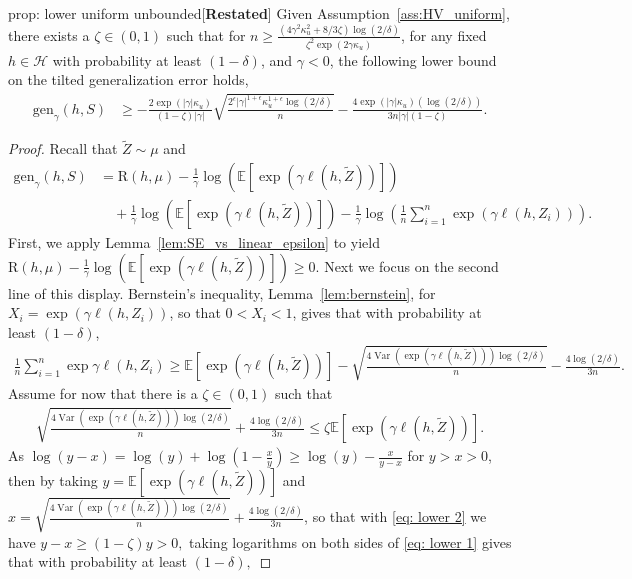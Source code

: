 \documentclass{article}
\theoremstyle{plain}
\theoremstyle{plain}
\theoremstyle{definition}
\theoremstyle{remark}
\newcommand{\blue}{\color{black}}
\begin{document}
{\blue
\begin{tcolorbox}
    \begin{repproposition}{prop: lower uniform unbounded}[\textbf{Restated}]
    Given Assumption~\ref{ass:HV_uniform}, there exists a $\zeta\in(0,1)$ such that for $n\geq \frac{(4\gamma^2\kappa_u^2+8/3 \zeta )\log(2/\delta)}{\zeta^2\exp(2\gamma \kappa_u)}$, for any fixed $h\in\mathcal{H}$ with probability at least $(1-\delta)$, and $\gamma<0$, the following lower bound on the tilted generalization error holds,
    \begin{equation} 
    \begin{split}
    \mathrm{gen}_{\gamma}(h,S)&\geq -\frac{2\exp(|\gamma| \kappa_u)}{(1-\zeta)|\gamma|}\sqrt{\frac{2^{\epsilon}|\gamma|^{1+\epsilon}\kappa_u^{1+\epsilon}\log(2/\delta)}{n}}-\frac{4\exp(|\gamma| \kappa_u)(\log(2/\delta))}{3n|\gamma|(1-\zeta)}. 
        \end{split}
        \end{equation}
\end{repproposition}
\end{tcolorbox}

\begin{proof}
    Recall that $\tilde{Z} \sim \mu$ and $$\begin{aligned} \mathrm{gen}_{\gamma}(h,S) &= \mathrm{R}(h,\mu)-\frac{1}{\gamma}\log(\mathbb{E}[\exp(\gamma \ell(h,\tilde{Z}))])\\&\quad+\frac{1}{\gamma}\log(\mathbb{E} [\exp(\gamma \ell(h,\tilde{Z}))])-\frac{1}{\gamma}\log\left(\frac{1}{n}\sum_{i=1}^n \exp(\gamma \ell(h,Z_i))\right). \end{aligned}$$ First, we apply Lemma~\ref{lem:SE_vs_linear_epsilon} to yield $\mathrm{R}(h,\mu)-\frac{1}{\gamma}\log(\mathbb{E} [\exp(\gamma \ell(h,\tilde{Z}))]) \ge 0$. Next we focus on the second line of this display. Bernstein's inequality, Lemma~\ref{lem:bernstein}, for $X_i=\exp(\gamma\ell(h,Z_i))$, so that $0<X_i<1$, gives that with probability at least $(1-\delta)$,
\begin{align}\label{eq: lower 1} \frac{1}{n}\sum_{i=1}^n \exp{\gamma \ell(h,Z_i)}\geq \mathbb{E}[\exp(\gamma \ell(h,\tilde Z))]- \sqrt{\frac{4\operatorname{Var}(\exp(\gamma \ell(h,\tilde Z)))\log(2/\delta)}{n}}-\frac{4\log(2/\delta)}{3n}. \end{align}
Assume for now that there is a $\zeta\in(0,1)$ such that \begin{align}\label{eq: lower 2} \sqrt{\frac{4\operatorname{Var}(\exp(\gamma \ell(h,\tilde Z)))\log(2/\delta)}{n}}+\frac{4\log(2/\delta)}{3n}\leq \zeta \mathbb{E}[\exp(\gamma \ell(h,\tilde Z))]. \end{align} 
As $\log(y-x)=\log(y)+\log(1-\frac{x}{y})\geq \log(y)-\frac{x}{y-x}$ for $y>x>0$, then by taking $y= \mathbb{E} [\exp(\gamma \ell(h,\tilde Z))]$ and $x=\sqrt{\frac{4\operatorname{Var}(\exp(\gamma \ell(h,\tilde Z)))\log(2/\delta)}{n}}+\frac{4\log(2/\delta)}{3n}$, so that with \eqref{eq: lower 2} we have $ y - x \ge (1- \zeta) y>0,$ taking logarithms on both sides of \eqref{eq: lower 1} gives that with probability at least $(1-\delta),$ 


\end{proof}}
\end{document}
